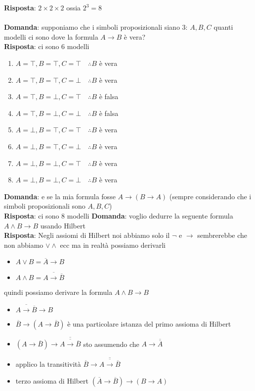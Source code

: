 \documentclass{article}
\begin{document}
\textbf{Risposta}: $2 \times 2 \times 2$ ossia $2^3 = 8$\\ \\
\textbf{Domanda}: supponiamo che i simboli proposizionali siano 3: $A, B, C$ quanti modelli ci sono dove la formula $A \to B$ è vera? \\
\textbf{Risposta}: ci sono 6 modelli
\begin{enumerate}
    \item $A = \top, B = \top, C = \top \quad \therefore B$ è vera
    \item $A = \top, B = \top, C = \bot \quad \therefore B$ è vera
    \item $A = \top, B = \bot, C = \top \quad \therefore B$ è falsa
    \item $A = \top, B = \bot, C = \bot \quad \therefore B$ è falsa
    \item $A = \bot, B = \top, C = \top \quad \therefore B$ è vera
    \item $A = \bot, B = \top, C = \bot \quad \therefore B$ è vera
    \item $A = \bot, B = \bot, C = \top \quad \therefore B$ è vera
    \item $A = \bot, B = \bot, C = \bot \quad \therefore B$ è vera
\end{enumerate}
\textbf{Domanda}: e se la mia formula fosse $A \to (B \to A)$ (sempre considerando che i simboli proposizionali sono $A, B, C$) \\
\textbf{Risposta}: ci sono 8 modelli
\textbf{Domanda}: voglio dedurre la seguente formula $A \land B \to B$ usando Hilbert \\
\textbf{Risposta}: Negli assiomi di Hilbert noi abbiamo solo il $\lnot$ e $\to$ sembrerebbe che non abbiamo $\lor \land$ ecc ma in realtà possiamo derivarli
\begin{itemize}
    \item $A \lor B = \overline{A} \to B$
    \item $A \land B = \overline{A \to \overline{B}}$
\end{itemize}
quindi possiamo derivare la formula $A \land B \to B$
\begin{itemize}
    \item $\overline{A \to \overline{B}} \to B$
    \item $\overline{B} \to (A \to \overline{B})$ è una particolare istanza del primo assioma di Hilbert
    \item $(A \to \overline{B}) \to \overline{\overline{A \to \overline{B}}}$ sto assumendo che $A \to \overline{\overline{A}}$
    \item applico la transitività $\overline{B} \to \overline{\overline{A \to \overline{B}}}$
    \item terzo assioma di Hilbert $(\overline{A} \to \overline{B}) \to (B \to A)$
\end{itemize}
\end{document}
